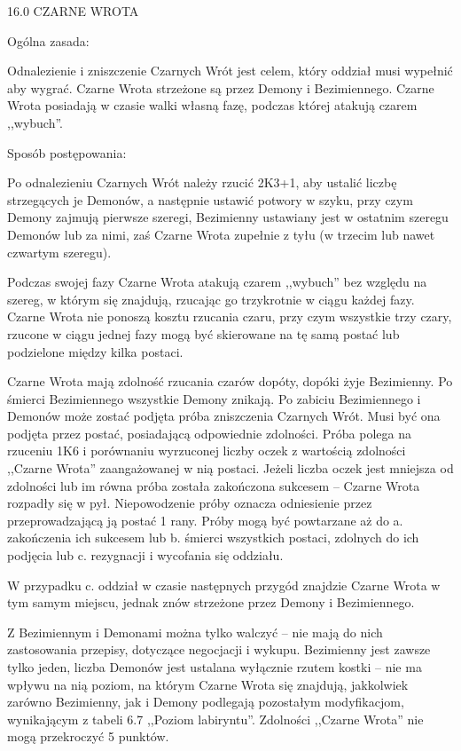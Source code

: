 16.0 CZARNE WROTA

Ogólna zasada:

Odnalezienie i zniszczenie Czarnych Wrót jest celem, który oddział musi wypełnić aby wygrać.
Czarne Wrota strzeżone są przez Demony i Bezimiennego.
Czarne Wrota posiadają w czasie walki własną fazę, podczas której atakują czarem ,,wybuch''.

Sposób postępowania:

Po odnalezieniu Czarnych Wrót należy rzucić 2K3+1, aby ustalić liczbę strzegących je Demonów, a następnie ustawić potwory w szyku, przy czym Demony zajmują pierwsze szeregi, Bezimienny ustawiany jest w ostatnim szeregu Demonów lub za nimi, zaś Czarne Wrota zupełnie z tyłu (w trzecim lub nawet czwartym szeregu).

Podczas swojej fazy Czarne Wrota atakują czarem ,,wybuch'' bez względu na szereg, w którym się znajdują, rzucając go trzykrotnie w ciągu każdej fazy.
Czarne Wrota nie ponoszą kosztu rzucania czaru, przy czym wszystkie trzy czary, rzucone w ciągu jednej fazy mogą być skierowane na tę samą postać lub podzielone między kilka postaci.

Czarne Wrota mają zdolność rzucania czarów dopóty, dopóki żyje Bezimienny.
Po śmierci Bezimiennego wszystkie Demony znikają.
Po zabiciu Bezimiennego i Demonów może zostać podjęta próba zniszczenia Czarnych Wrót.
Musi być ona podjęta przez postać, posiadającą odpowiednie zdolności.
Próba polega na rzuceniu 1K6 i porównaniu wyrzuconej liczby oczek z wartością zdolności ,,Czarne Wrota'' zaangażowanej w nią postaci.
Jeżeli liczba oczek jest mniejsza od zdolności lub im równa próba została zakończona sukcesem – Czarne Wrota rozpadły się w pył.
Niepowodzenie próby oznacza odniesienie przez przeprowadzającą ją postać 1 rany.
Próby mogą być powtarzane aż do a. zakończenia ich sukcesem lub b. śmierci wszystkich postaci, zdolnych do ich podjęcia lub c. rezygnacji i wycofania się oddziału.

W przypadku c. oddział w czasie następnych przygód znajdzie Czarne Wrota w tym samym miejscu, jednak znów strzeżone przez Demony i Bezimiennego.

Z Bezimiennym i Demonami można tylko walczyć – nie mają do nich zastosowania przepisy, dotyczące negocjacji i wykupu.
Bezimienny jest zawsze tylko jeden, liczba Demonów jest ustalana wyłącznie rzutem kostki – nie ma wpływu na nią poziom, na którym Czarne Wrota się znajdują, jakkolwiek zarówno Bezimienny, jak i Demony podlegają pozostałym modyfikacjom, wynikającym z tabeli 6.7 ,,Poziom labiryntu''.
Zdolności ,,Czarne Wrota'' nie mogą przekroczyć 5 punktów.
